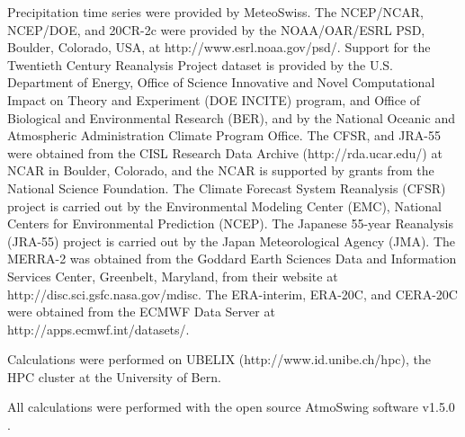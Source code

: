 \documentclass{ametsoc}
\begin{document}
%
\acknowledgments
Precipitation time series were provided by MeteoSwiss. The NCEP/NCAR, NCEP/DOE, and 20CR-2c were provided by the NOAA/OAR/ESRL PSD, Boulder, Colorado, USA, at http://www.esrl.noaa.gov/psd/. Support for the Twentieth Century Reanalysis Project dataset is provided by the U.S. Department of Energy, Office of Science Innovative and Novel Computational Impact on Theory and Experiment (DOE INCITE) program, and Office of Biological and Environmental Research (BER), and by the National Oceanic and Atmospheric Administration Climate Program Office. The CFSR, and JRA-55 were obtained from the CISL Research Data Archive (http://rda.ucar.edu/) at NCAR in Boulder, Colorado, and the NCAR is supported by grants from the National Science Foundation. The Climate Forecast System Reanalysis (CFSR) project is carried out by the Environmental Modeling Center (EMC), National Centers for Environmental Prediction (NCEP). The Japanese 55-year Reanalysis (JRA-55) project is carried out by the Japan Meteorological Agency (JMA). The MERRA-2 was obtained from the Goddard Earth Sciences Data and Information Services Center, Greenbelt, Maryland, from their website at http://disc.sci.gsfc.nasa.gov/mdisc. The ERA-interim, ERA-20C, and CERA-20C were obtained from the ECMWF Data Server at http://apps.ecmwf.int/datasets/. 

Calculations were performed on UBELIX (http://www.id.unibe.ch/hpc), the HPC cluster at the University of Bern.

All calculations were performed with the open source AtmoSwing software v1.5.0 \citep{Horton2017a}.


%



\end{document}
